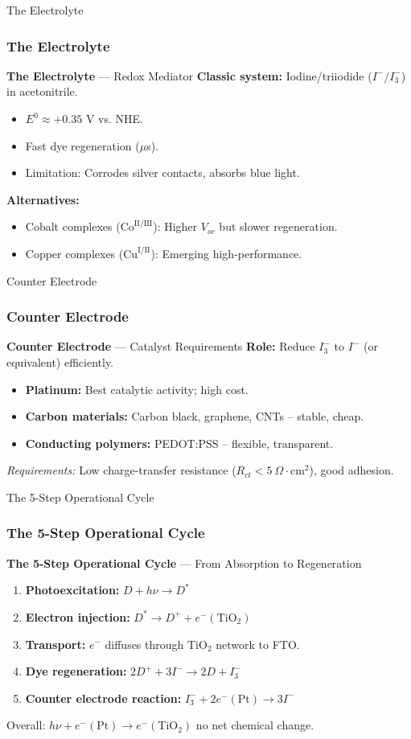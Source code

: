 \documentclass[aspectratio=169]{beamer}
\begin{document}
\begin{frame}{The Electrolyte}
\frametitle{The Electrolyte}

\textbf{The Electrolyte} — Redox Mediator
\textbf{Classic system:} Iodine/triiodide ($I^-/I_3^-$) in acetonitrile.
\begin{itemize}
\item $E^0 \approx +0.35$ V vs. NHE.
\item Fast dye regeneration ($\mu$s).
\item Limitation: Corrodes silver contacts, absorbs blue light.
\end{itemize}
\textbf{Alternatives:}
\begin{itemize}
\item Cobalt complexes ($\text{Co}^{\text{II/III}}$): Higher $V_{oc}$ but slower regeneration.
\item Copper complexes ($\text{Cu}^{\text{I/II}}$): Emerging high-performance.
\end{itemize}
\cite{Feldt2010}
\end{frame}


\begin{frame}{Counter Electrode}
\frametitle{Counter Electrode}

\textbf{Counter Electrode} — Catalyst Requirements
\textbf{Role:} Reduce $I_3^-$ to $I^-$ (or equivalent) efficiently.
\begin{itemize}
\item \textbf{Platinum:} Best catalytic activity; high cost.
\item \textbf{Carbon materials:} Carbon black, graphene, CNTs – stable, cheap.
\item \textbf{Conducting polymers:} PEDOT:PSS – flexible, transparent.
\end{itemize}
\textit{Requirements:} Low charge-transfer resistance ($R_{ct} < 5\ \Omega\cdot$cm$^2$), good adhesion.
\cite{Trancik2007}
\end{frame}


\begin{frame}{The 5-Step Operational Cycle}
\frametitle{The 5-Step Operational Cycle}

\textbf{The 5-Step Operational Cycle} — From Absorption to Regeneration
\begin{enumerate}
\item \textbf{Photoexcitation:} $D + h\nu \rightarrow D^*$
\item \textbf{Electron injection:} $D^* \rightarrow D^+ + e^- (\text{TiO}_2)$
\item \textbf{Transport:} $e^-$ diffuses through TiO$_2$ network to FTO.
\item \textbf{Dye regeneration:} $2D^+ + 3I^- \rightarrow 2D + I_3^-$
\item \textbf{Counter electrode reaction:} $I_3^- + 2e^- (\text{Pt}) \rightarrow 3I^-$
\end{enumerate}
Overall: $h\nu + e^- (\text{Pt}) \rightarrow e^- (\text{TiO}_2)$ no net chemical change.
\end{frame}
\end{document}
